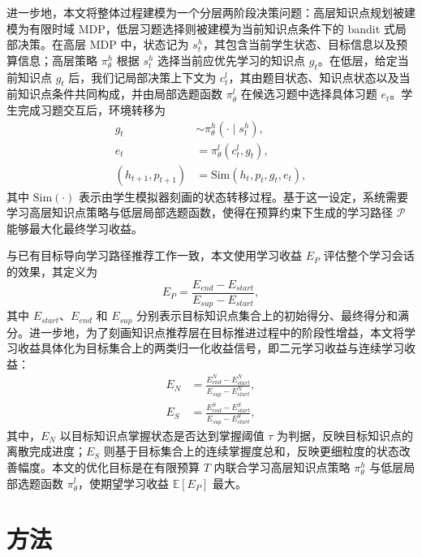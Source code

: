 \documentclass[11pt,a4paper]{article}
\begin{document}
进一步地，本文将整体过程建模为一个分层两阶段决策问题：高层知识点规划被建模为有限时域 MDP，低层习题选择则被建模为当前知识点条件下的 bandit 式局部决策。在高层 MDP 中，状态记为 $s_t^h$，其包含当前学生状态、目标信息以及预算信息；高层策略 $\pi^h_\theta$ 根据 $s_t^h$ 选择当前应优先学习的知识点 $g_t$。在低层，给定当前知识点 $g_t$ 后，我们记局部决策上下文为 $c_t^l$，其由题目状态、知识点状态以及当前知识点条件共同构成，并由局部选题函数 $\pi^l_\theta$ 在候选习题中选择具体习题 $e_t$。学生完成习题交互后，环境转移为
\begin{equation}
\begin{aligned}
g_t &\sim \pi^h_\theta(\cdot\mid s_t^h),\\
e_t &= \pi^l_\theta(c_t^l,g_t),\\
(h_{t+1},p_{t+1}) &= \mathrm{Sim}(h_t,p_t,g_t,e_t),
\end{aligned}
\end{equation}
其中 $\mathrm{Sim}(\cdot)$ 表示由学生模拟器\cite{liu2019exploiting}刻画的状态转移过程。基于这一设定，系统需要学习高层知识点策略与低层局部选题函数，使得在预算约束下生成的学习路径 $\mathcal{P}$ 能够最大化最终学习收益。

与已有目标导向学习路径推荐工作一致，本文使用学习收益 $E_P$ 评估整个学习会话的效果，其定义为
\begin{equation}
E_P=\frac{E_{end}-E_{start}}{E_{sup}-E_{start}},
\end{equation}
其中 $E_{start}$、$E_{end}$ 和 $E_{sup}$ 分别表示目标知识点集合上的初始得分、最终得分和满分。进一步地，为了刻画知识点推荐层在目标推进过程中的阶段性增益，本文将学习收益具体化为目标集合上的两类归一化收益信号，即二元学习收益与连续学习收益：
\begin{equation}
\begin{aligned}
E_N
&=
\frac{E_{end}^{N}-E_{start}^{N}}{E_{sup}-E_{start}^{N}},\\
E_S
&=
\frac{E_{end}^{S}-E_{start}^{S}}{E_{sup}-E_{start}^{S}},
\end{aligned}
\end{equation}
其中，$E_N$ 以目标知识点掌握状态是否达到掌握阈值 $\tau$ 为判据，反映目标知识点的离散完成进度；$E_S$ 则基于目标集合上的连续掌握度总和，反映更细粒度的状态改善幅度。本文的优化目标是在有限预算 $T$ 内联合学习高层知识点策略 $\pi^h_\theta$ 与低层局部选题函数 $\pi^l_\theta$，使期望学习收益 $\mathbb{E}[E_P]$ 最大。

\section{方法}
\end{document}
